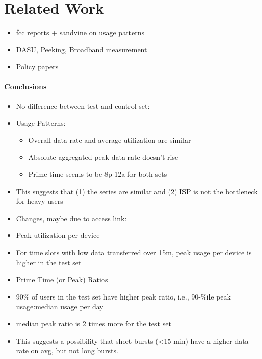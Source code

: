 \section{Related Work}
\label{related}

\begin{itemize}
\itemsep0em
\item fcc reports + sandvine on usage patterns
\item DASU, Peeking, Broadband measurement
\item Policy papers
\end{itemize}


\paragraph{Conclusions}
\begin{itemize}
\itemsep0em
\item No difference between test and control set:
\item Usage Patterns:
	\begin{itemize}
	\item Overall data rate and average utilization are similar
	\item Absolute aggregated peak data rate doesn’t rise
	\item Prime time seems to be 8p-12a for both sets
	\end{itemize}
\item This suggests that (1) the series are similar and (2) ISP is not the bottleneck for heavy users
\item Changes, maybe due to access link:
\item Peak utilization per device
\item For time slots with low data transferred over 15m, peak usage per device is higher in the test set
\item Prime Time (or Peak) Ratios
\item 90\% of users in the test set have higher peak ratio, i.e., 90-\%ile peak usage:median usage per day
\item median peak ratio is 2 times more for the test set
\item This suggests a possibility that short bursts (<15 min) have a higher data rate on avg, but not long bursts.


\end{itemize}